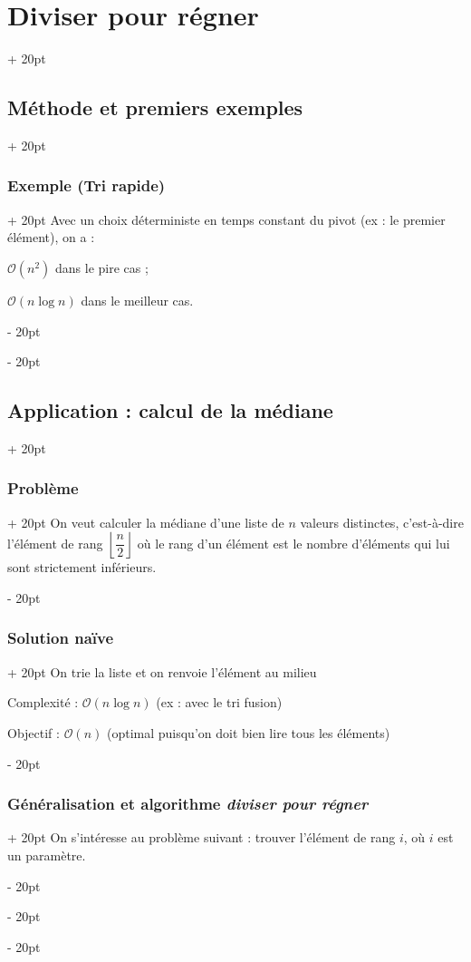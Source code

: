 \documentclass[a4paper, 12pt, twoside]{article}
\newcommand{\floor}[1]{\left\lfloor #1 \right\rfloor}
\newcommand{\ind}[1][20pt]{\advance\leftskip + #1}
\newcommand{\deind}[1][20pt]{\advance\leftskip - #1}
\newenvironment{indt}[2][20pt]{#2 \par \ind[#1]}{\par \deind} %
\begin{document}
\begin{indt}{\section{Diviser pour régner}}
\begin{indt}{\subsection{Méthode et premiers exemples}}
\begin{indt}{\subsubsection{Exemple (Tri rapide)}}
                Avec un choix déterministe en temps constant du pivot (ex : le premier élément), on a :
                
                $\mathcal O(n^2)$ dans le pire cas ;
                
                $\mathcal O(n\log n)$ dans le meilleur cas.
            \end{indt}
        \end{indt}
        
        \vspace{12pt}
        
        \begin{indt}{\subsection{Application : calcul de la médiane}}
            \begin{indt}{\subsubsection{Problème}}
                On veut calculer la médiane d'une liste de $n$ valeurs distinctes, c'est-à-dire l'élément de rang $\floor{\dfrac n 2}$ où le rang d'un élément est le nombre d'éléments qui lui sont strictement inférieurs.
            \end{indt}
            
            \vspace{12pt}
            
            \begin{indt}{\subsubsection{Solution naïve}}
                On trie la liste et on renvoie l'élément au milieu
                
                Complexité : $\mathcal O(n\log n)$ (ex : avec le tri fusion)
                
                Objectif : $\mathcal O(n)$ (optimal puisqu'on doit bien lire tous les éléments)
            \end{indt}
            
            \vspace{12pt}
            
            \begin{indt}{\subsubsection{Généralisation et algorithme \textit{diviser pour régner}}}
                On s'intéresse au problème suivant : trouver l'élément de rang $i$, où $i$ est un paramètre.
                

\end{indt}
\end{indt}
\end{indt}
\end{document}

